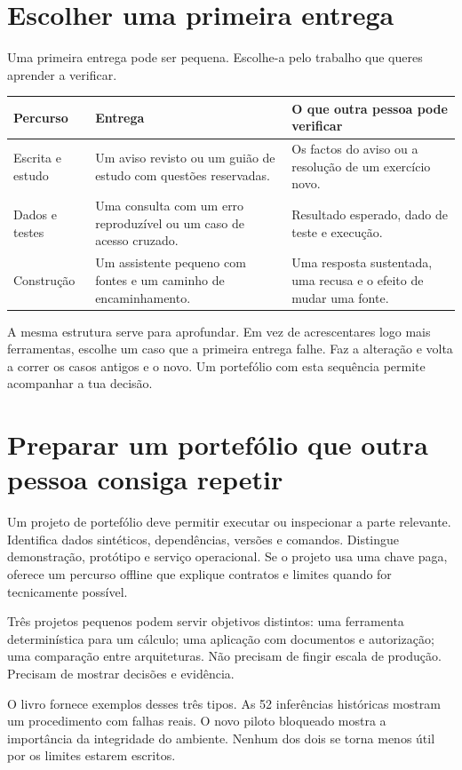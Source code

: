 \section{Escolher uma primeira entrega}

Uma primeira entrega pode ser pequena. Escolhe-a pelo trabalho que queres aprender a verificar.

\begin{center}
\small
\begin{tabularx}{\textwidth}{@{}p{}XX@{}}
\toprule
Percurso & Entrega & O que outra pessoa pode verificar \\
\midrule
Escrita e estudo & Um aviso revisto ou um guião de estudo com questões reservadas. & Os factos do aviso ou a resolução de um exercício novo. \\
Dados e testes & Uma consulta com um erro reproduzível ou um caso de acesso cruzado. & Resultado esperado, dado de teste e execução. \\
Construção & Um assistente pequeno com fontes e um caminho de encaminhamento. & Uma resposta sustentada, uma recusa e o efeito de mudar uma fonte. \\
\bottomrule
\end{tabularx}
\end{center}

A mesma estrutura serve para aprofundar. Em vez de acrescentares logo mais ferramentas, escolhe um caso que a primeira entrega falhe. Faz a alteração e volta a correr os casos antigos e o novo. Um portefólio com esta sequência permite acompanhar a tua decisão.

\section{Preparar um portefólio que outra pessoa consiga repetir}
Um projeto de portefólio deve permitir executar ou inspecionar a parte relevante. Identifica dados sintéticos, dependências, versões e comandos. Distingue demonstração, protótipo e serviço operacional. Se o projeto usa uma chave paga, oferece um percurso offline que explique contratos e limites quando for tecnicamente possível.

Três projetos pequenos podem servir objetivos distintos: uma ferramenta determinística para um cálculo; uma aplicação com documentos e autorização; uma comparação entre arquiteturas. Não precisam de fingir escala de produção. Precisam de mostrar decisões e evidência.

O livro fornece exemplos desses três tipos. As 52 inferências históricas mostram um procedimento com falhas reais. O novo piloto bloqueado mostra a importância da integridade do ambiente. Nenhum dos dois se torna menos útil por os limites estarem escritos.

